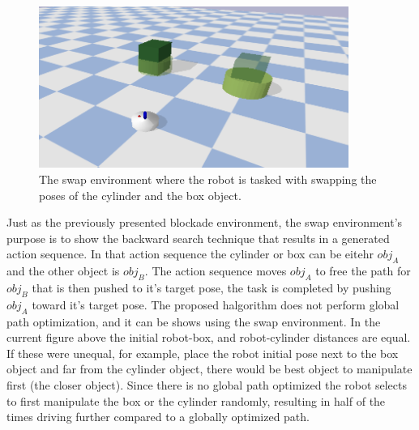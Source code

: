 \begin{figure}[H]
  \centering
  \includegraphics[width=0.9\textwidth]{figures/results/swap}
  \caption{The swap environment where the robot is tasked with swapping the poses of the cylinder and the box object.}%
  \label{fig:benchmark_swap}
\end{figure}
Just as the previously presented blockade environment, the swap environment's purpose is to show the backward search technique that results in a generated action sequence. In that action sequence the cylinder or box can be eitehr $\mathit{obj_A}$ and the other object is $\mathit{obj_B}$. The action sequence moves $\mathit{obj_A}$ to free the path for $\mathit{obj_B}$ that is then pushed to it's target pose, the task is completed by pushing $\mathit{obj_A}$ toward it's target pose. The proposed \ac{halgorithm} does not perform global path optimization, and it can be shows using the swap environment. In the current figure above the initial robot-box, and robot-cylinder distances are equal. If these were unequal, for example, place the robot initial pose next to the box object and far from the cylinder object, there would be best object to manipulate first (the closer object). Since there is no global path optimized the robot selects to first manipulate the box or the cylinder randomly, resulting in half of the times driving further compared to a globally optimized path.\bs

